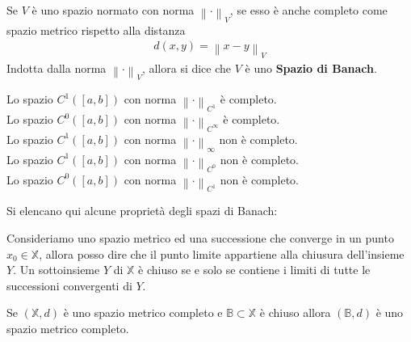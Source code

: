\documentclass[a4paper, oneside]{book}
\begin{document}
\begin{definition}
    Se $V$ è uno spazio normato con norma $\left\lVert \cdot  \right\rVert _{V}$, se
    esso è anche completo come spazio metrico rispetto alla distanza 
    \begin{gather*}
        d(x, y) = \left\lVert x - y \right\rVert _{V}
    \end{gather*} 
    Indotta dalla norma $\left\lVert \cdot  \right\rVert  _{V}$, allora
    si dice che $V$ è uno \textbf{Spazio di Banach}. 
\end{definition}

\begin{observation}
    Lo spazio $C^{1}([a, b])$ con norma $\left\lVert \cdot  \right\rVert _{C^{1}}$ è completo. \\
    Lo spazio $C^{0}([a, b])$ con norma $\left\lVert \cdot  \right\rVert _{C^{\infty }}$  è completo.  \\
    Lo spazio $C^{1}([a, b])$ con norma $\left\lVert  \cdot \right\rVert _{\infty }$ non è completo.  \\
    Lo spazio $C^{1}([a, b])$ con norma $\left\lVert \cdot  \right\rVert _{C^{0}}$ non è completo. \\
    Lo spazio $C^{0}([a, b])$ con norma $\left\lVert \cdot  \right\rVert _{C^{1}}$ non è completo.
\end{observation} \noindent
Si elencano qui alcune proprietà degli spazi di Banach:
\begin{observation}
    Consideriamo uno spazio metrico ed una successione che converge in un
    punto $x_0 \in \mathbb{X}$, allora posso dire che il punto limite
    appartiene alla chiusura dell'insieme $Y$. Un sottoinsieme
    $Y$ di $\mathbb{X}$ è chiuso se e solo se contiene i limiti di tutte le successioni
    convergenti di $Y$. 
\end{observation}

\begin{observation}
    Se $(\mathbb{X}, d)$ è uno spazio metrico completo e
    $\mathbb{B} \subset \mathbb{X}$ è chiuso allora $(\mathbb{B}, d)$ è uno spazio metrico completo. 
\end{observation}
\end{document}

